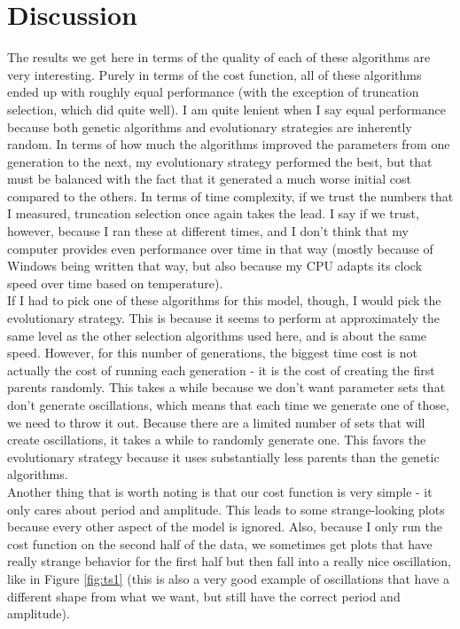 \documentclass[]{article}
\begin{document}
	\section{Discussion}
	The results we get here in terms of the quality of each of these algorithms are very interesting. Purely in terms of the cost function, all of these algorithms ended up with roughly equal performance (with the exception of truncation selection, which did quite well). I am quite lenient when I say equal performance because both genetic algorithms and evolutionary strategies are inherently random. In terms of how much the algorithms improved the parameters from one generation to the next, my evolutionary strategy performed the best, but that must be balanced with the fact that it generated a much worse initial cost compared to the others. In terms of time complexity, if we trust the numbers that I measured, truncation selection once again takes the lead. I say if we trust, however, because I ran these at different times, and I don't think that my computer provides even performance over time in that way (mostly because of Windows being written that way, but also because my CPU adapts its clock speed over time based on temperature). \\
	
	If I had to pick one of these algorithms for this model, though, I would pick the evolutionary strategy. This is because it seems to perform at approximately the same level as the other selection algorithms used here, and is about the same speed. However, for this number of generations, the biggest time cost is not actually the cost of running each generation - it is the cost of creating the first parents randomly. This takes a while because we don't want parameter sets that don't generate oscillations, which means that each time we generate one of those, we need to throw it out. Because there are a limited number of sets that will create oscillations, it takes a while to randomly generate one. This favors the evolutionary strategy because it uses substantially less parents than the genetic algorithms. \\
	
	Another thing that is worth noting is that our cost function is very simple - it only cares about period and amplitude. This leads to some strange-looking plots because every other aspect of the model is ignored. Also, because I only run the cost function on the second half of the data, we sometimes get plots that have really strange behavior for the first half but then fall into a really nice oscillation, like in Figure \ref{fig:ts1} (this is also a very good example of oscillations that have a different shape from what we want, but still have the correct period and amplitude). \\
\end{document}
